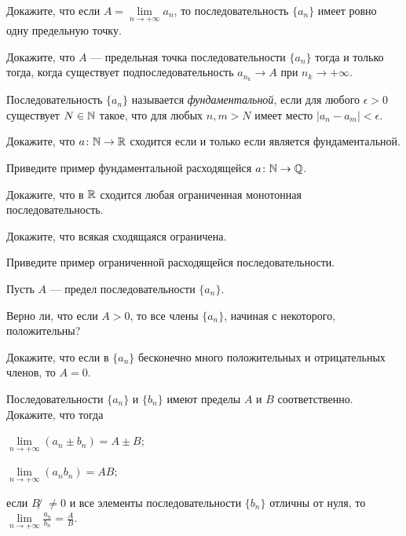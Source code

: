 \documentclass[a4paper, 12pt, num=30]{listok}
\begin{document}
\begin{problem}
    Докажите, что если $A = \lim\limits_{n \to +\infty} a_n$, то последовательность $\{a_n\}$ имеет ровно одну предельную точку.
\end{problem}
\begin{problem}
    Докажите, что $A$ --- предельная точка последовательности $\{a_n\}$ тогда и только тогда, когда существует подпоследовательность $a_{n_k} \to A$ при $n_k \to +\infty$.
\end{problem}
\begin{definition}
    Последовательность $\{a_n\}$ называется \textit{фундаментальной}, если для любого $\epsilon > 0$ существует $N \in \mathbb{N}$ такое,
    что для любых $n, m > N$ имеет место  $|a_n - a_m| < \epsilon$.
\end{definition}
\begin{problem}
    Докажите, что $a \colon \mathbb{N} \to \mathbb{R}$ сходится если и только если является фундаментальной.
\end{problem}
\begin{problem}
    Приведите пример фундаментальной расходящейся $a \colon \mathbb{N} \to \mathbb{Q}$.
\end{problem}
\begin{problem}
    Докажите, что в $\mathbb{R}$ сходится любая ограниченная монотонная последовательность.
\end{problem}
\begin{problem}
    \begin{probparts}
        \item Докажите, что всякая сходящаяся ограничена.
        \item Приведите пример ограниченной расходящейся последовательности.
    \end{probparts}
\end{problem}
\begin{problem}
    Пусть $A$ --- предел последовательности $\{a_n\}$.
    \begin{probparts}
        \item Верно ли, что если $A > 0$, то все члены $\{a_n\}$, начиная с некоторого, положительны?
        \item Докажите, что если в $\{a_n\}$ бесконечно много положительных и отрицательных членов, то $A = 0$.
    \end{probparts}
\end{problem}
\begin{problem}
    Последовательности $\{a_n\}$ и $\{b_n\}$ имеют пределы $A$ и $B$ соответственно.
    Докажите, что тогда
    \begin{probenum}
        \item $\lim\limits_{n \to +\infty} (a_n \pm b_n) = A \pm B$;
        \item $\lim\limits_{n \to +\infty} (a_n  b_n) = A B$;
        \item если $B ̸\ne 0$ и все элементы последовательности $\{b_n\}$ отличны от нуля, то
            $\lim\limits_{n \to +\infty} \frac{a_n}{b_n} = \frac AB$.
    \end{probenum}
\end{problem}
\end{document}
